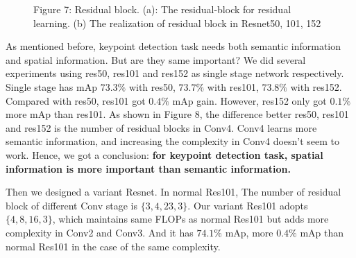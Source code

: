 \captionsetup[figure]{labelformat=empty}
\begin{figure}
  \centering
  \hspace{1in}
  \caption{Figure 7: Residual block. (a): The residual-block for residual learning. (b) The realization of residual block in Resnet50, 101, 152}
  \label{fig:1} %
\end{figure}

As mentioned before, keypoint detection task needs both semantic information and spatial information.
But are they same important?
We did several experiments using res50, res101 and res152 as single stage network respectively.
Single stage has mAp $73.3\%$ with res50, $73.7\%$ with res101, $73.8\%$ with res152.
Compared with res50, res101 got $0.4\%$ mAp gain.
However, res152 only got $0.1\%$ more mAp than res101.
As shown in Figure 8, the difference better res50, res101 and res152 is the number of residual blocks in Conv4.
Conv4 learns more semantic information, and increasing the complexity in Conv4 doesn't seem to work.
Hence, we got a conclusion: \textbf{for keypoint detection task, spatial information is more important than semantic information.}

Then we designed a variant Resnet.
In normal Res101, The number of residual block of different Conv stage is $\{3, 4, 23, 3\}$.
Our variant Res101 adopts $\{4, 8, 16, 3\}$, which maintains same FLOPs as normal Res101 but adds more complexity in Conv2 and Conv3.
And it has $74.1\%$ mAp, more $0.4\%$ mAp than normal Res101 in the case of the same complexity.


